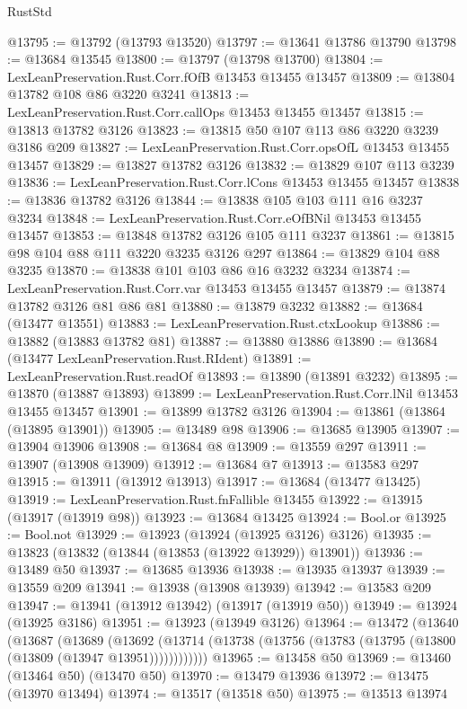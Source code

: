 \begin{lexlean}{RustStd}
\begin{coremodule}
{\begin{coremodule}
{{{{{{{{{{{{{{{{{{{{{{{{{{{{{{{{{{{{{@13795 := @13792 (@13793 @13520)
@13797 := @13641 @13786 @13790
@13798 := @13684 @13545
@13800 := @13797 (@13798 @13700)
@13804 := LexLeanPreservation.Rust.Corr.fOfB @13453 @13455 @13457
@13809 := @13804 @13782 @108 @86 @3220 @3241
@13813 := LexLeanPreservation.Rust.Corr.callOps @13453 @13455 @13457
@13815 := @13813 @13782 @3126
@13823 := @13815 @50 @107 @113 @86 @3220 @3239 @3186 @209
@13827 := LexLeanPreservation.Rust.Corr.opsOfL @13453 @13455 @13457
@13829 := @13827 @13782 @3126
@13832 := @13829 @107 @113 @3239
@13836 := LexLeanPreservation.Rust.Corr.lCons @13453 @13455 @13457
@13838 := @13836 @13782 @3126
@13844 := @13838 @105 @103 @111 @16 @3237 @3234
@13848 := LexLeanPreservation.Rust.Corr.eOfBNil @13453 @13455 @13457
@13853 := @13848 @13782 @3126 @105 @111 @3237
@13861 := @13815 @98 @104 @88 @111 @3220 @3235 @3126 @297
@13864 := @13829 @104 @88 @3235
@13870 := @13838 @101 @103 @86 @16 @3232 @3234
@13874 := LexLeanPreservation.Rust.Corr.var @13453 @13455 @13457
@13879 := @13874 @13782 @3126 @81 @86 @81
@13880 := @13879 @3232
@13882 := @13684 (@13477 @13551)
@13883 := LexLeanPreservation.Rust.ctxLookup
@13886 := @13882 (@13883 @13782 @81)
@13887 := @13880 @13886
@13890 := @13684 (@13477 LexLeanPreservation.Rust.RIdent)
@13891 := LexLeanPreservation.Rust.readOf
@13893 := @13890 (@13891 @3232)
@13895 := @13870 (@13887 @13893)
@13899 := LexLeanPreservation.Rust.Corr.lNil @13453 @13455 @13457
@13901 := @13899 @13782 @3126
@13904 := @13861 (@13864 (@13895 @13901))
@13905 := @13489 @98
@13906 := @13685 @13905
@13907 := @13904 @13906
@13908 := @13684 @8
@13909 := @13559 @297
@13911 := @13907 (@13908 @13909)
@13912 := @13684 @7
@13913 := @13583 @297
@13915 := @13911 (@13912 @13913)
@13917 := @13684 (@13477 @13425)
@13919 := LexLeanPreservation.Rust.fnFallible @13455
@13922 := @13915 (@13917 (@13919 @98))
@13923 := @13684 @13425
@13924 := Bool.or
@13925 := Bool.not
@13929 := @13923 (@13924 (@13925 @3126) @3126)
@13935 := @13823 (@13832 (@13844 (@13853 (@13922 @13929)) @13901))
@13936 := @13489 @50
@13937 := @13685 @13936
@13938 := @13935 @13937
@13939 := @13559 @209
@13941 := @13938 (@13908 @13939)
@13942 := @13583 @209
@13947 := @13941 (@13912 @13942) (@13917 (@13919 @50))
@13949 := @13924 (@13925 @3186)
@13951 := @13923 (@13949 @3126)
@13964 := @13472
    (@13640
      (@13687
        (@13689
          (@13692 (@13714 (@13738 (@13756 (@13783 (@13795 (@13800 (@13809 (@13947 @13951))))))))))))
@13965 := @13458 @50
@13969 := @13460 (@13464 @50) (@13470 @50)
@13970 := @13479 @13936
@13972 := @13475 (@13970 @13494)
@13974 := @13517 (@13518 @50)
@13975 := @13513 @13974
}}}}}}}}}}}}}}}}}}}}}}}}}}}}}}}}}}}}}
\end{coremodule}}
\end{coremodule}
\end{lexlean}
